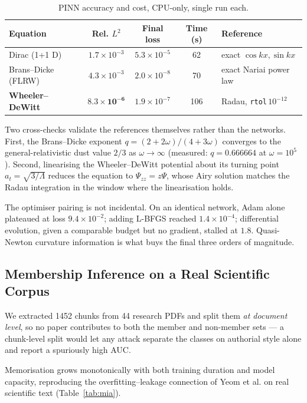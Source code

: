 \documentclass[11pt,a4paper]{article}
\theoremstyle{plain}
\theoremstyle{definition}
\begin{document}
\begin{table}[h]
\centering
\caption{PINN accuracy and cost, CPU-only, single run each.}
\begin{tabular}{lcccl}
\toprule
\textbf{Equation} & \textbf{Rel. $L^2$} & \textbf{Final loss} & \textbf{Time (s)} & \textbf{Reference} \\
\midrule
Dirac (1+1 D)        & $1.7\times10^{-3}$ & $5.3\times10^{-5}$ & 62 & exact $\cos kx,\sin kx$ \\
Brans--Dicke (FLRW)  & $4.3\times10^{-3}$ & $2.0\times10^{-8}$ & 70 & exact Nariai power law \\
\textbf{Wheeler--DeWitt} & $\mathbf{8.3\times10^{-6}}$ & $1.9\times10^{-7}$ & 106 & Radau, \texttt{rtol}\,$10^{-12}$ \\
\bottomrule
\end{tabular}
\label{tab:pinn}
\end{table}

Two cross-checks validate the references themselves rather than the networks.
First, the Brans--Dicke exponent $q=(2+2\omega)/(4+3\omega)$ converges to the
general-relativistic dust value $2/3$ as $\omega\to\infty$ (measured:
$q=0.666664$ at $\omega=10^{5}$). Second, linearising the Wheeler--DeWitt
potential about its turning point $a_t=\sqrt{3/\Lambda}$ reduces the equation
to $\Psi_{zz}=z\Psi$, whose Airy solution matches the Radau integration in the
window where the linearisation holds.

The optimiser pairing is not incidental. On an identical network, Adam alone
plateaued at loss $9.4\times10^{-2}$; adding L-BFGS reached
$1.4\times10^{-4}$; differential evolution, given a comparable budget but no
gradient, stalled at $1.8$. Quasi-Newton curvature information is what buys
the final three orders of magnitude.

\subsection{Membership Inference on a Real Scientific Corpus}

We extracted 1452 chunks from 44 research PDFs and split them
\emph{at document level}, so no paper contributes to both the member and
non-member sets --- a chunk-level split would let any attack separate the
classes on authorial style alone and report a spuriously high AUC.

Memorisation grows monotonically with both training duration and model
capacity, reproducing the overfitting--leakage connection of Yeom et al. on
real scientific text (Table~\ref{tab:mia}).
\end{document}
